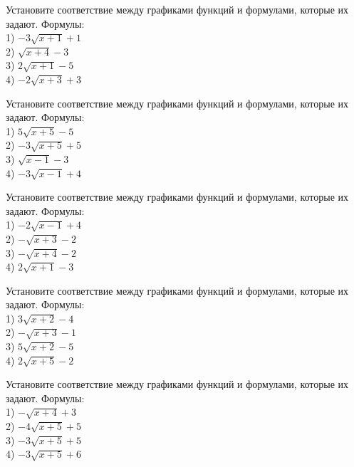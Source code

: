 \documentclass[4apaper]{article}
\begin{document}
\begin{taskBN}{46}
Установите соответствие между графиками функций и формулами, которые их задают. Формулы: \\1) $-3\sqrt{x+1}+1$\\2) $\sqrt{x+4}-3$\\3) $2\sqrt{x+1}-5$\\4) $-2\sqrt{x+3}+3$
\end{taskBN}

\begin{taskBN}{47}
Установите соответствие между графиками функций и формулами, которые их задают. Формулы: \\1) $5\sqrt{x+5}-5$\\2) $-3\sqrt{x+5}+5$\\3) $\sqrt{x-1}-3$\\4) $-3\sqrt{x-1}+4$
\end{taskBN}

\begin{taskBN}{48}
Установите соответствие между графиками функций и формулами, которые их задают. Формулы: \\1) $-2\sqrt{x-1}+4$\\2) $-\sqrt{x+3}-2$\\3) $-\sqrt{x+4}-2$\\4) $2\sqrt{x+1}-3$
\end{taskBN}

\begin{taskBN}{49}
Установите соответствие между графиками функций и формулами, которые их задают. Формулы: \\1) $3\sqrt{x+2}-4$\\2) $-\sqrt{x+3}-1$\\3) $5\sqrt{x+2}-5$\\4) $2\sqrt{x+5}-2$
\end{taskBN}

\begin{taskBN}{50}
Установите соответствие между графиками функций и формулами, которые их задают. Формулы: \\1) $-\sqrt{x+4}+3$\\2) $-4\sqrt{x+5}+5$\\3) $-3\sqrt{x+5}+5$\\4) $-3\sqrt{x+5}+6$
\end{taskBN}
\end{document}
